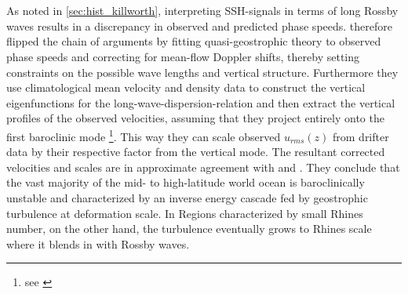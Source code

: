 \section*{\citealt{Tulloch2009}}\label{sec:hist-tulloch}
As noted in \ref{sec:hist_killworth}, interpreting SSH-signals in terms of long
Rossby waves results in a discrepancy in observed and predicted phase speeds.
\cite{Tulloch2009} therefore flipped the chain of arguments by fitting
quasi-geostrophic theory to observed phase speeds and correcting for mean-flow
Doppler shifts, thereby setting constraints on the possible wave lengths and
vertical structure. Furthermore they use climatological mean velocity and
density data to construct the vertical eigenfunctions for the
long-wave-dispersion-relation and then extract the vertical profiles of the
observed velocities, assuming that they project entirely onto the first
baroclinic mode \footnote{see \cite{wunsch1996ocean}}. This way they can scale
observed $u_{rms}(z)$ from drifter data by their respective factor from the
vertical mode. The resultant corrected velocities and scales are in approximate
agreement with \cite{Eden2006b} and \cite{Chelton2007}. They conclude that the
vast majority of the mid- to high-latitude
world ocean is baroclinically unstable and characterized by an inverse energy cascade fed by geostrophic turbulence at deformation scale. In Regions characterized by small Rhines number, on the other hand, the turbulence eventually grows to Rhines scale where it blends in with Rossby waves.




